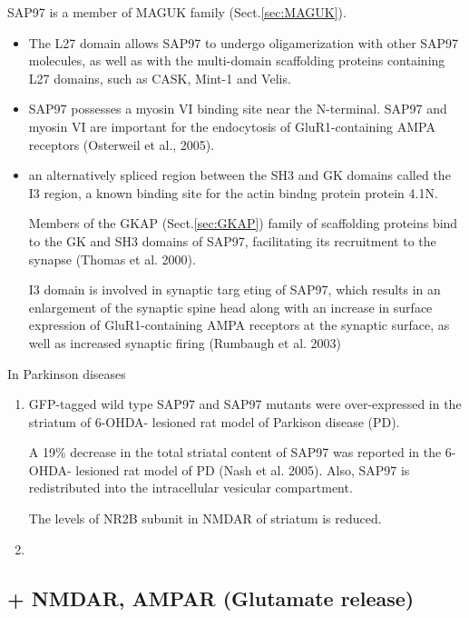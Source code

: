 SAP97 is a member of MAGUK family (Sect.\ref{sec:MAGUK}).
\begin{itemize}

  \item The L27 domain allows SAP97 to undergo oligamerization with other SAP97
molecules, as well as with the multi-domain scaffolding proteins containing L27
domains, such as CASK, Mint-1 and Velis.


  \item SAP97 possesses a myosin VI binding site  near the N-terminal.
SAP97 and  myosin VI are important for the endocytosis of GluR1-containing AMPA
receptors (Osterweil et al., 2005).
    
  \item  an alternatively spliced region between the SH3 and GK domains called
  the I3 region, a known binding site for the actin bindng protein protein 4.1N.
  
  Members of the  GKAP (Sect.\ref{sec:GKAP}) family of scaffolding proteins
  bind to the GK and SH3 domains of SAP97, facilitating its recruitment to the
  synapse (Thomas et al. 2000).

  I3 domain is involved in synaptic targ eting of SAP97, which results in an
  enlargement of the synaptic spine head along with an increase in surface
  expression of
GluR1-containing AMPA receptors at the synaptic surface, as well as increased
synaptic firing (Rumbaugh  et al. 2003)


\end{itemize}

In Parkinson diseases
\begin{enumerate}
  \item  GFP-tagged wild type SAP97 and SAP97 mutants were over-expressed in the
 striatum of 6-OHDA- lesioned rat model of Parkison disease (PD).
  
  A 19\% decrease in the total striatal content of SAP97 was reported in the 6-OHDA-
lesioned rat model of PD (Nash  et al.
 2005). Also, SAP97 is redistributed into the intracellular vesicular
 compartment.
  
  The levels of NR2B subunit in NMDAR of striatum is reduced.
  
   \item 
\end{enumerate}


\subsection{+ NMDAR, AMPAR (Glutamate release)}

